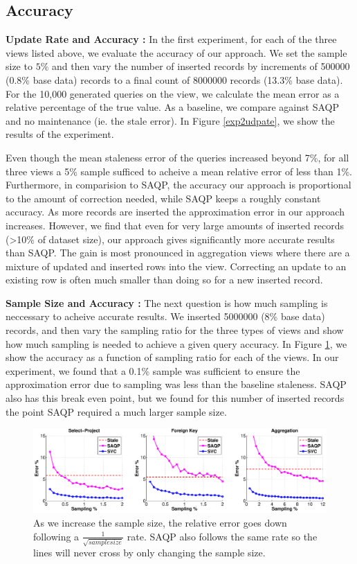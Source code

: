 \subsection{Accuracy}

{\noindent \bf Update Rate and Accuracy :}
In the first experiment, for each of the three views listed above, we evaluate the accuracy of our approach.
We set the sample size to $5\%$ and then vary the number of inserted records by increments of 500000 (0.8\% base data) records to a final count of 8000000 records (13.3\% base data).
For the 10,000 generated queries on the view, we calculate the mean error as a relative percentage of the true value.
As a baseline, we compare against SAQP and no maintenance (ie. the stale error).
In Figure \ref{exp2udpate}, we show the results of the experiment. 

Even though the mean staleness error of the queries increased beyond 7\%, for all three views a 5\% sample sufficed to acheive a mean relative error of less than 1\%.
Furthermore, in comparision to SAQP, the accuracy our approach is proportional to the amount of correction needed, while SAQP keeps a roughly constant accuracy.
As more records are inserted the approximation error in our approach increases.
However, we find that even for very large amounts of inserted records (>10\% of dataset size), our approach gives significantly more accurate results
than SAQP.
The gain is most pronounced in aggregation views where there are a mixture of updated and inserted rows into the view.
Correcting an update to an existing row is often much smaller than doing so for a new inserted record.

{\noindent \bf Sample Size and Accuracy :} The next question is how much sampling is neccessary to acheive accurate results.
We inserted 5000000 (8\% base data) records, and then vary the sampling ratio for the three types of views and show how much sampling is needed to achieve a given query accuracy.
In Figure \ref{exp1sample}, we show the accuracy as a function of sampling ratio for each of the views.
In our experiment, we found that a 0.1\% sample was sufficient to ensure the approximation error due to sampling was less than the baseline staleness.
SAQP also has this break even point, but we found for this number of inserted records the point SAQP required a much larger sample size.

\begin{figure}[ht!]
\label{exp1sample}
\hspace{-3em}
 \includegraphics[scale=0.20]{exp/exp1-samplesize-accuracy.eps}
 \caption{As we increase the sample size, the relative error goes down following a $\frac{1}{\sqrt{samplesize}}$ rate. SAQP also follows the same rate so the lines will never cross by only changing the sample size.}
\end{figure}

